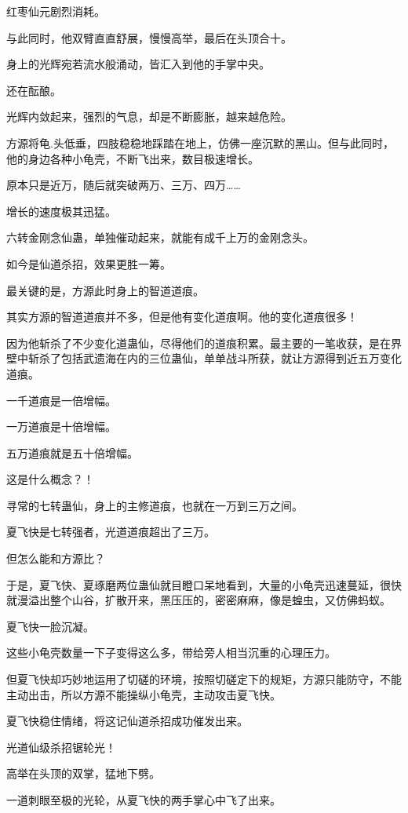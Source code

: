 \begin{this_body}
红枣仙元剧烈消耗。

与此同时，他双臂直直舒展，慢慢高举，最后在头顶合十。

身上的光辉宛若流水般涌动，皆汇入到他的手掌中央。

还在酝酿。

光辉内敛起来，强烈的气息，却是不断膨胀，越来越危险。

方源将龟.头低垂，四肢稳稳地踩踏在地上，仿佛一座沉默的黑山。但与此同时，他的身边各种小龟壳，不断飞出来，数目极速增长。

原本只是近万，随后就突破两万、三万、四万……

增长的速度极其迅猛。

六转金刚念仙蛊，单独催动起来，就能有成千上万的金刚念头。

如今是仙道杀招，效果更胜一筹。

最关键的是，方源此时身上的智道道痕。

其实方源的智道道痕并不多，但是他有变化道痕啊。他的变化道痕很多！

因为他斩杀了不少变化道蛊仙，尽得他们的道痕积累。最主要的一笔收获，是在界壁中斩杀了包括武遗海在内的三位蛊仙，单单战斗所获，就让方源得到近五万变化道痕。

一千道痕是一倍增幅。

一万道痕是十倍增幅。

五万道痕就是五十倍增幅。

这是什么概念？！

寻常的七转蛊仙，身上的主修道痕，也就在一万到三万之间。

夏飞快是七转强者，光道道痕超出了三万。

但怎么能和方源比？

于是，夏飞快、夏琢磨两位蛊仙就目瞪口呆地看到，大量的小龟壳迅速蔓延，很快就漫溢出整个山谷，扩散开来，黑压压的，密密麻麻，像是蝗虫，又仿佛蚂蚁。

夏飞快一脸沉凝。

这些小龟壳数量一下子变得这么多，带给旁人相当沉重的心理压力。

但夏飞快却巧妙地运用了切磋的环境，按照切磋定下的规矩，方源只能防守，不能主动出击，所以方源不能操纵小龟壳，主动攻击夏飞快。

夏飞快稳住情绪，将这记仙道杀招成功催发出来。

光道仙级杀招锯轮光！

高举在头顶的双掌，猛地下劈。

一道刺眼至极的光轮，从夏飞快的两手掌心中飞了出来。


\end{this_body}
